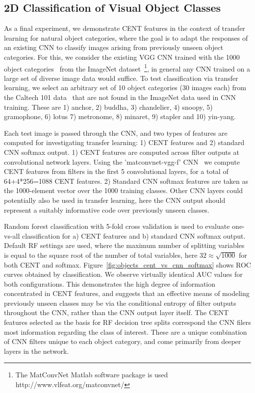\documentclass[10pt,onecolumn]{article}
\begin{document}
\subsection{2D Classification of Visual Object Classes} 

As a final experiment, we demonstrate CENT features in the context of transfer learning for natural object categories, where the goal is to adapt the responses of an existing CNN to classify images arising from previously unseen object categories. For this, we consider the existing VGG CNN trained with the 1000 object categories~\cite{chatfield2014return} from the ImageNet dataset~\cite{deng2009imagenet}\footnote{The MatConvNet Matlab software package is used http://www.vlfeat.org/matconvnet/}, in general any CNN trained on a large set of diverse image data would suffice. To test classification via transfer learning, we select an arbitrary set of 10 object categories (30 images each) from the Caltech 101 data~\cite{fei2007learning} that are not found in the ImageNet data used in CNN training. These are 1) anchor, 2) buddha, 3) chandelier, 4) snoopy, 5) gramophone, 6) lotus 7) metronome, 8) minaret, 9) stapler and 10) yin-yang.

Each test image is passed through the CNN, and two types of features are computed for investigating transfer learning: 1) CENT features and 2) standard CNN softmax output. 1) CENT features are computed across filter outputs at convolutional network layers. Using the 'matconvnet-vgg-f' CNN~\cite{chatfield2014return} we compute CENT features from filters in the first 5 convolutional layers, for a total of 64+4*256=1088 CENT features. 2) Standard CNN softmax features are taken as the 1000-element vector over the 1000 training classes. Other CNN layers could potentially also be used in transfer learning, here the CNN output should represent a suitably informative code over previously unseen classes.

Random forest classification with 5-fold cross validation is used to evaluate one-vs-all classification for a) CENT features and b) standard CNN softmax output. Default RF settings are used, where the maximum number of splitting variables is equal to the square root of the number of total variables, here $32 \approx \sqrt{1000}$ for both CENT and softmax. Figure~\ref{fig:objects_cent_vs_cnn_softmax} shows ROC curves obtained by classification. We observe virtually identical AUC values for both configurations. This demonstrates the high degree of information concentrated in CENT features, and suggests that an effective means of modeling previously unseen classes may be via the conditional entropy of filter outputs throughout the CNN, rather than the CNN output layer itself. The CENT features selected as the basis for RF decision tree splits correspond the CNN filers most information regarding the class of interest. These are a unique combination of CNN filters unique to each object category, and come primarily from deeper layers in the network.
\end{document}
